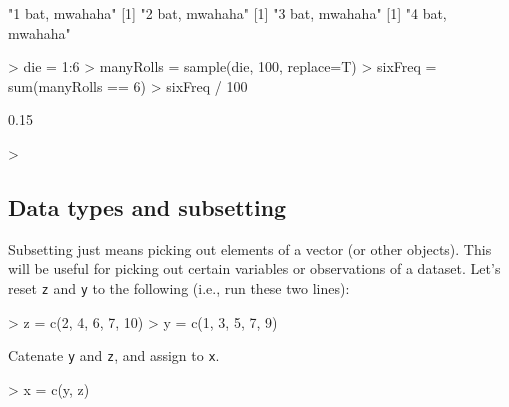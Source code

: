 \documentclass[answers]{exam}
\begin{document}
\begin{Schunk}
\begin{Soutput}
[1] "1 bat, mwahaha"
[1] "2 bat, mwahaha"
[1] "3 bat, mwahaha"
[1] "4 bat, mwahaha"
\end{Soutput}
\begin{Sinput}
> die = 1:6
> manyRolls = sample(die, 100, replace=T)
> sixFreq = sum(manyRolls == 6)
> sixFreq / 100
\end{Sinput}
\begin{Soutput}
[1] 0.15
\end{Soutput}
\begin{Sinput}
> 
\end{Sinput}
\end{Schunk}

\subsection{Data types and subsetting}

Subsetting just means picking out elements of a vector (or other objects). This will be useful for picking out certain variables or observations of a dataset. Let's reset \texttt{z} and \texttt{y} to the following (i.e., run these two lines):
\begin{Schunk}
\begin{Sinput}
> z = c(2, 4, 6, 7, 10)
> y = c(1, 3, 5, 7, 9)
\end{Sinput}
\end{Schunk}

\noindent Catenate \texttt{y} and \texttt{z}, and assign to \texttt{x}.
\begin{Schunk}
\begin{Sinput}
> x = c(y, z)  
\end{Sinput}
\end{Schunk}
\end{document}
